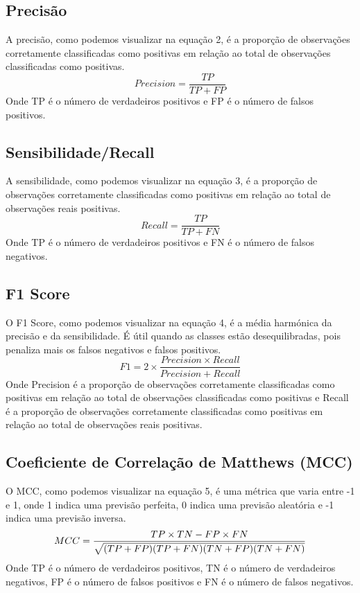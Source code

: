 \documentclass[conference]{IEEEtran}
\begin{document}
\subsection{Precisão}
A precisão, como podemos visualizar na equação 2, é a proporção de observações corretamente classificadas como positivas em relação ao total de observações classificadas como positivas.
\begin{equation}
	Precision = \frac{TP}{TP + FP}
\end{equation}
Onde TP é o número de verdadeiros positivos e FP é o número de falsos positivos.
\subsection{Sensibilidade/Recall}
A sensibilidade, como podemos visualizar na equação 3, é a proporção de observações corretamente classificadas como positivas em relação ao total de observações reais positivas.
\begin{equation}
	Recall = \frac{TP}{TP + FN}
\end{equation}
Onde TP é o número de verdadeiros positivos e FN é o número de falsos negativos.

\subsection{F1 Score}
O F1 Score, como podemos visualizar na equação 4, é a média harmónica da precisão e da sensibilidade. É útil quando as classes estão desequilibradas, pois penaliza mais os falsos negativos e
falsos positivos.
\begin{equation}
	F1 = 2 \times \frac{Precision \times Recall}{Precision + Recall}
\end{equation}
Onde Precision é a proporção de observações corretamente classificadas como positivas em relação ao total de observações classificadas como positivas e Recall
é a proporção de observações corretamente classificadas como positivas em relação ao total de observações reais positivas.

\subsection{Coeficiente de Correlação de Matthews (MCC)}
O MCC, como podemos visualizar na equação 5, é uma métrica que varia entre -1 e 1, onde 1 indica uma previsão perfeita, 0 indica uma previsão aleatória e -1 indica uma previsão inversa.
\begin{equation}
	\footnotesize
	MCC = \frac{TP \times TN - FP \times FN}{\sqrt{(TP + FP)(TP + FN)(TN + FP)(TN + FN)}}
\end{equation}
Onde TP é o número de verdadeiros positivos, TN é o número de verdadeiros negativos, FP é o número de falsos positivos e FN é o número de falsos negativos.
\end{document}
